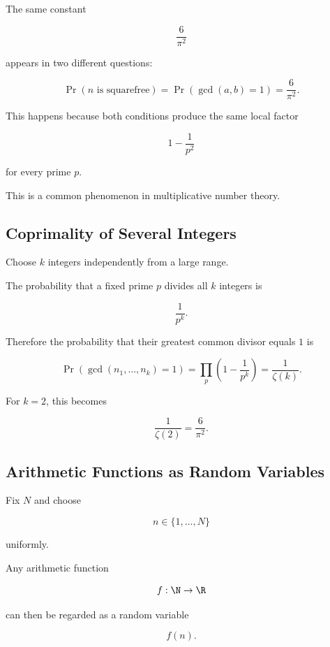 The same constant

\[ \frac6{\pi^2} \]

appears in two different questions:

\[
\boxed{
\Pr(n\text{ is squarefree})
=
\Pr(\gcd(a,b)=1)
=
\frac6{\pi^2}.
}
\]

This happens because both conditions produce the same local factor

\[ 1-\frac1{p^2} \]

for every prime \(p\).

This is a common phenomenon in multiplicative number theory.

\subsection{Coprimality of Several Integers}
\label{subsec:coprimality-several-integers}

Choose \(k\) integers independently from a large range.

The probability that a fixed prime \(p\) divides all \(k\) integers is

\[ \frac1{p^k}. \]

Therefore the probability that their greatest common divisor equals \(1\) is

\[
\boxed{
\Pr(\gcd(n_1,\ldots,n_k)=1)
=
\prod_p\left(1-\frac1{p^k}\right)
=
\frac1{\zeta(k)}.
}
\]

For \(k=2\), this becomes

\[ \frac1{\zeta(2)}=\frac6{\pi^2}. \]

\subsection{Arithmetic Functions as Random Variables}
\label{subsec:arithmetic-functions-random-variables}

Fix \(N\) and choose

\[ n\in\{1,\ldots,N\} \]

uniformly.

Any arithmetic function

\[ f:\N\to\R \]

can then be regarded as a random variable

\[ f(n). \]

